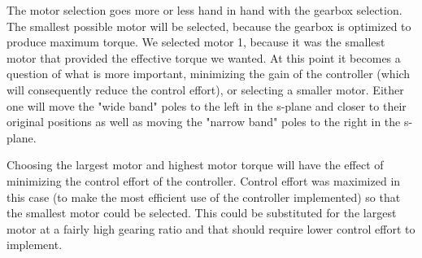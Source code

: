 The motor selection goes more or less hand in hand with the gearbox selection. The smallest possible motor will be selected, because the gearbox is optimized to produce maximum torque. We selected motor 1, because it was the smallest motor that provided the effective torque we wanted. At this point it becomes a question of what is more important, minimizing the gain of the controller (which will consequently reduce the control effort), or selecting a smaller motor. Either one will move the "wide band" poles to the left in the s-plane and closer to their original positions as well as moving the "narrow band" poles to the right in the s-plane.

Choosing the largest motor and highest motor torque will have the effect of minimizing the control effort of the controller. Control effort was maximized in this case (to make the most efficient use of the controller implemented) so that the smallest motor could be selected. This could be substituted for the largest motor at a fairly high gearing ratio and that should require lower control effort to implement.